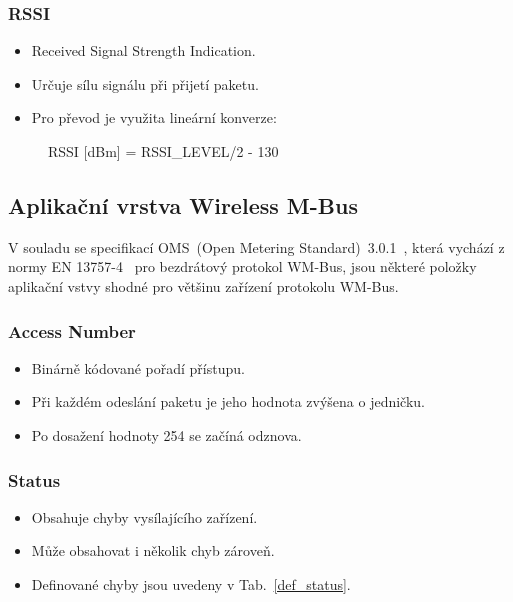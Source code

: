 \newpage

\subsubsection{RSSI}
\begin{itemize}
	\item Received Signal Strength Indication.
	\item Určuje sílu signálu při přijetí paketu.
	\item Pro převod je využita lineární konverze:
\end{itemize}	
				\begin{figure}[!ht]
				\begin{centerverbatim}
				RSSI [dBm] = RSSI_LEVEL/2 - 130
				\end{centerverbatim}
			\end{figure}



\subsection{Aplikační vrstva Wireless M-Bus}

V souladu se specifikací OMS~(Open Metering Standard)~3.0.1~\cite{NormaOMS}, která vychází z normy EN 13757-4~\cite{Norma4} pro bezdrátový protokol WM-Bus, jsou některé položky aplikační vstvy shodné pro většinu zařízení protokolu WM-Bus.


\subsubsection{Access Number}
\begin{itemize}
	\item Binárně kódované pořadí přístupu.
	\item Při každém odeslání paketu je jeho hodnota zvýšena o jedničku.
	\item Po dosažení hodnoty 254 se začíná odznova.
\end{itemize}

\subsubsection{Status}
\begin{itemize}
	\item Obsahuje chyby vysílajícího zařízení.
	\item Může obsahovat i několik chyb zároveň.
	\item Definované chyby jsou uvedeny v Tab.~\ref{def_status}.
\end{itemize}

